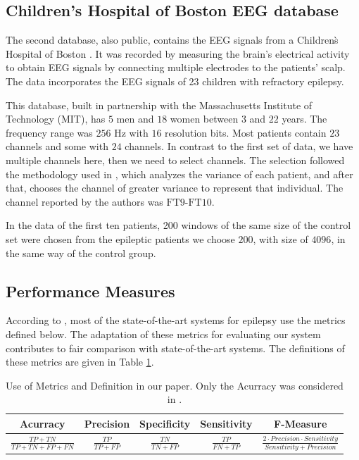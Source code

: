 \subsection{Children's Hospital of Boston EEG database}

The second database, also public, contains the EEG signals from a Children\`s Hospital of Boston
\cite{Shoeb}. It was recorded by measuring the brain's electrical activity to obtain EEG signals by connecting multiple electrodes to the patients’ scalp. The data incorporates the EEG signals of 23 children with refractory epilepsy.

This database, built in partnership with the Massachusetts Institute of Technology (MIT), has $5$ men and $18$ women between $3$ and $22$ years. The frequency range was $256$ Hz with $16$ resolution bits. Most patients contain $ 23 $ channels and some with $24$ channels. In contrast to the first set of data, we have multiple channels here, then we need to select channels. The selection followed the methodology used in \cite{shoeb2009application}, which analyzes the variance of each patient, and after that, chooses the channel of greater variance to represent that individual. The channel reported by the authors was $\text{FT9-FT10}$.

In the data of the first ten patients, 200 windows of the same size of the control set were chosen from the epileptic patients we choose $200$, with size of $4096$, in the same way of the control group.


\subsection{Performance Measures}

According to \cite{roy2019deep}, most of the state-of-the-art systems for epilepsy use the metrics defined below. The adaptation of these metrics for evaluating our system contributes to fair comparison with state-of-the-art systems. The definitions of these metrics are given in Table \ref{table:metrics}.

\begin{table}[!ht]
\centering
\begin{tabular}{ccccc}
\hline
 \textbf{Acurracy} & \textbf{Precision} & \textbf{Specificity} & \textbf{Sensitivity} & \textbf{F-Measure} \\ \hline
 $\frac{TP+TN}{TP+TN+FP+FN}$ & $\frac{TP}{TP+FP}$ & $\frac{TN}{TN+FP}$ & $\frac{TP}{FN+TP}$ & $\frac{2\cdot Precision \cdot Sensitivity}{Sensitivity+Precision}$\\ \hline
\end{tabular}
\caption{Use of Metrics and Definition in our paper. Only the Acurracy was considered in \cite{WenZha:2018}.}
\label{table:metrics}
\end{table}

